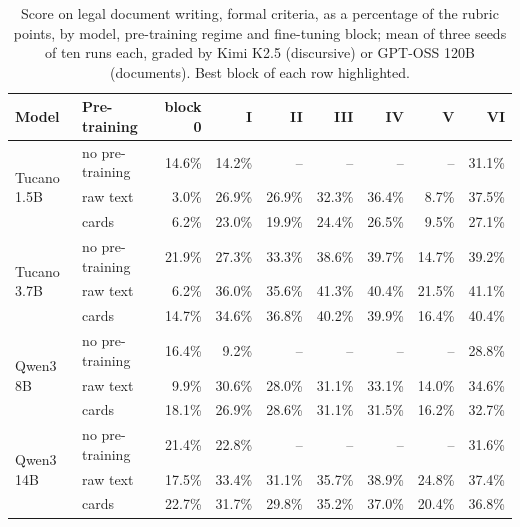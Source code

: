 \documentclass{IOS-Book-Article}
\begin{document}
\begin{table}[!ht]
\centering
\caption{Score on legal document writing, formal criteria, as a percentage of the rubric points, by model, pre-training regime and fine-tuning block; mean of three seeds of ten runs each, graded by Kimi K2.5 (discursive) or GPT-OSS 120B (documents). Best block of each row highlighted.}
\footnotesize\setlength{\tabcolsep}{3pt}
\begin{tabular}{llrrrrrrr}
\hline
\textbf{Model} & \textbf{Pre-training} & \textbf{block 0} & \textbf{I} & \textbf{II} & \textbf{III} & \textbf{IV} & \textbf{V} & \textbf{VI} \\
\hline
\multirow{3}{*}{Tucano 1.5B} & no pre-training & 14.6\% & 14.2\% & -- & -- & -- & -- & 31.1\% \\
 & raw text & 3.0\% & 26.9\% & 26.9\% & 32.3\% & 36.4\% & 8.7\% & 37.5\% \\
 & cards & 6.2\% & 23.0\% & 19.9\% & 24.4\% & 26.5\% & 9.5\% & 27.1\% \\
\multirow{3}{*}{Tucano 3.7B} & no pre-training & 21.9\% & 27.3\% & 33.3\% & 38.6\% & 39.7\% & 14.7\% & 39.2\% \\
 & raw text & 6.2\% & 36.0\% & 35.6\% & 41.3\% & 40.4\% & 21.5\% & 41.1\% \\
 & cards & 14.7\% & 34.6\% & 36.8\% & 40.2\% & 39.9\% & 16.4\% & 40.4\% \\
\multirow{3}{*}{Qwen3 8B} & no pre-training & 16.4\% & 9.2\% & -- & -- & -- & -- & 28.8\% \\
 & raw text & 9.9\% & 30.6\% & 28.0\% & 31.1\% & 33.1\% & 14.0\% & 34.6\% \\
 & cards & 18.1\% & 26.9\% & 28.6\% & 31.1\% & 31.5\% & 16.2\% & 32.7\% \\
\multirow{3}{*}{Qwen3 14B} & no pre-training & 21.4\% & 22.8\% & -- & -- & -- & -- & 31.6\% \\
 & raw text & 17.5\% & 33.4\% & 31.1\% & 35.7\% & 38.9\% & 24.8\% & 37.4\% \\
 & cards & 22.7\% & 31.7\% & 29.8\% & 35.2\% & 37.0\% & 20.4\% & 36.8\% \\
\hline
\end{tabular}
\end{table}
\end{document}
